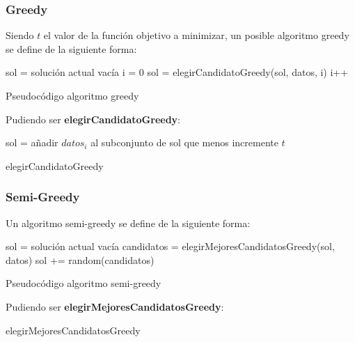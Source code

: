 \documentclass[13pt,a4paper]{article}
\begin{document}
\subsubsection{Greedy}

Siendo $t$ el valor de la función objetivo a minimizar, un posible algoritmo greedy se define de la siguiente forma:

\begin{algorithm}[H]
    \SetAlgoLined
        sol = solución actual vacía \;
        i = 0 \;
         {
            sol = elegirCandidatoGreedy(sol, datos, i) \;
            i++ \;
        }        
    \caption{Pseudocódigo algoritmo greedy}
\end{algorithm}

\vspace{\baselineskip}

Pudiendo ser \textbf{elegirCandidatoGreedy}:

\begin{algorithm}[H]
    \SetAlgoLined
        sol = añadir $datos_{i}$ al subconjunto de sol que menos incremente $t$ \;
    \caption{elegirCandidatoGreedy}
\end{algorithm}


\subsubsection{Semi-Greedy}

Un algoritmo semi-greedy se define de la siguiente forma:

\begin{algorithm}[H]
    \SetAlgoLined
        sol = solución actual vacía \;
         {
            candidatos = elegirMejoresCandidatosGreedy(sol, datos) \;
            sol += random(candidatos) \;
        }        
    \caption{Pseudocódigo algoritmo semi-greedy}
\end{algorithm}

\vspace{\baselineskip}

Pudiendo ser \textbf{elegirMejoresCandidatosGreedy}:

\begin{algorithm}[H]
    \SetAlgoLined
    \caption{elegirMejoresCandidatosGreedy}
\end{algorithm}
\end{document}
